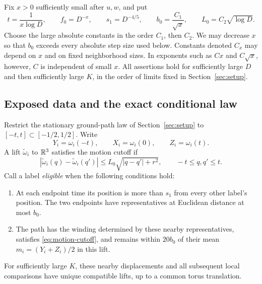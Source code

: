 Fix $x>0$ sufficiently small after $u,w$, and put
\begin{equation}\label{eq:path-scales}
 t=\frac1{x\log D},\qquad f_0=D^{-x},\qquad s_1=D^{-4/5},
 \qquad b_0=\frac{C_1}{\sqrt x},\qquad L_0=C_2\sqrt{\log D}.
\end{equation}
Choose the large absolute constants in the order $C_1$, then $C_2$.
We may decrease $x$ so that $b_0$ exceeds every absolute step size used
below.  Constants denoted $C_x$ may depend on $x$ and on fixed
neighborhood sizes.  In exponents such as $Cx$ and $C\sqrt x$, however,
$C$ is independent of small $x$.  All assertions hold for sufficiently
large $D$ and then sufficiently large $K$, in the order of limits fixed
in Section~\ref{sec:setup}.

\subsection{Exposed data and the exact conditional law}

Restrict the stationary ground-path law of Section~\ref{sec:setup} to
$[-t,t]\subset[-1/2,1/2]$.  Write
\[
 Y_i=\omega_i(-t),\qquad X_i=\omega_i(0),\qquad Z_i=\omega_i(t).
\]
A lift $\widetilde\omega_i$ to $\mathbb R^3$ satisfies the motion cutoff if
\begin{equation}\label{eq:motion-cutoff}
 |\widetilde\omega_i(q)-\widetilde\omega_i(q')|
 \le L_0\sqrt{|q-q'|+r^2},\qquad -t\le q,q'\le t.
\end{equation}
Call a label \emph{eligible} when the following conditions hold:
\begin{enumerate}
\item At each endpoint time its position is more than $s_1$ from every
other label's position.  The two endpoints have representatives at
Euclidean distance at most $b_0$.
\item The path has the winding determined by these nearby representatives,
satisfies \eqref{eq:motion-cutoff}, and remains within $20b_0$ of their
mean $m_i=(Y_i+Z_i)/2$ in this lift.
\end{enumerate}
For sufficiently large $K$, these nearby displacements and all subsequent
local comparisons have unique compatible lifts, up to a common torus
translation.


